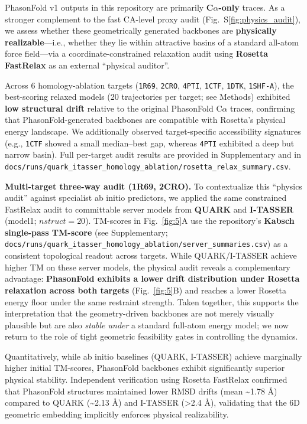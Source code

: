 PhasonFold v1 outputs in this repository are primarily \textbf{C$\alpha$-only} traces. As a stronger complement to the fast CA-level proxy audit (Fig.~S\ref{fig:physics_audit}), we assess whether these geometrically generated backbones are \textbf{physically realizable}---i.e., whether they lie within attractive basins of a standard all-atom force field---via a coordinate-constrained relaxation audit using \textbf{Rosetta FastRelax} as an external ``physical auditor''.

Across 6 homology-ablation targets (\texttt{1R69}, \texttt{2CRO}, \texttt{4PTI}, \texttt{1CTF}, \texttt{1DTK}, \texttt{1SHF-A}), the best-scoring relaxed models (20 trajectories per target; see Methods) exhibited \textbf{low structural drift} relative to the original PhasonFold C$\alpha$ traces, confirming that PhasonFold-generated backbones are compatible with Rosetta's physical energy landscape. We additionally observed target-specific accessibility signatures (e.g., \texttt{1CTF} showed a small median--best gap, whereas \texttt{4PTI} exhibited a deep but narrow basin). Full per-target audit results are provided in Supplementary and in \texttt{docs/runs/quark\_itasser\_homology\_ablation/rosetta\_relax\_summary.csv}.

\textbf{Multi-target three-way audit (1R69, 2CRO).} To contextualize this ``physics audit'' against specialist ab initio predictors, we applied the same constrained FastRelax audit to committable server models from \textbf{QUARK} and \textbf{I-TASSER} (model1; $nstruct=20$). TM-scores in Fig.~\ref{fig:5}A use the repository's \textbf{Kabsch single-pass TM-score} (see Supplementary; \texttt{docs/runs/quark\_itasser\_homology\_ablation/server\_summaries.csv}) as a consistent topological readout across targets. While QUARK/I-TASSER achieve higher TM on these server models, the physical audit reveals a complementary advantage: \textbf{PhasonFold exhibits a lower drift distribution under Rosetta relaxation across both targets} (Fig.~\ref{fig:5}B) and reaches a lower Rosetta energy floor under the same restraint strength.
Taken together, this supports the interpretation that the geometry-driven backbones are not merely visually plausible but are also \emph{stable under} a standard full-atom energy model; we now return to the role of tight geometric feasibility gates in controlling the dynamics.

Quantitatively, while ab initio baselines (QUARK, I-TASSER) achieve marginally higher initial TM-scores, PhasonFold backbones exhibit significantly superior physical stability. Independent verification using Rosetta FastRelax confirmed that PhasonFold structures maintained lower RMSD drifts (mean \textasciitilde{}1.78 \AA{}) compared to QUARK (\textasciitilde{}2.13 \AA{}) and I-TASSER (>2.4 \AA{}), validating that the 6D geometric embedding implicitly enforces physical realizability.

